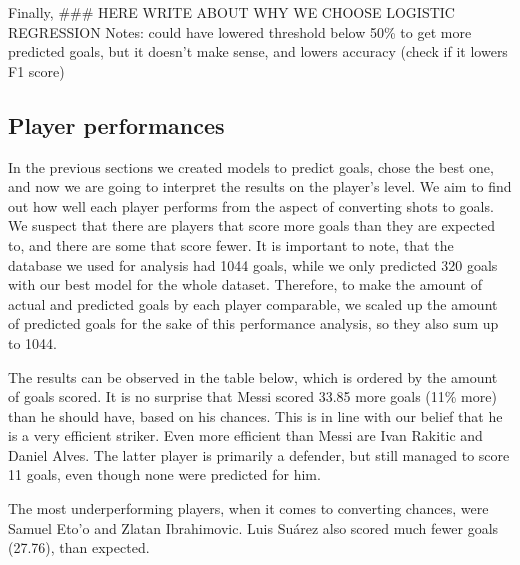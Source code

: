 \documentclass[]{article}
\begin{document}
Finally, \#\#\# HERE WRITE ABOUT WHY WE CHOOSE LOGISTIC REGRESSION
Notes: could have lowered threshold below 50\% to get more predicted
goals, but it doesn't make sense, and lowers accuracy (check if it
lowers F1 score)

\hypertarget{player-performances}{%
\subsection{Player performances}\label{player-performances}}

In the previous sections we created models to predict goals, chose the
best one, and now we are going to interpret the results on the player's
level. We aim to find out how well each player performs from the aspect
of converting shots to goals. We suspect that there are players that
score more goals than they are expected to, and there are some that
score fewer. It is important to note, that the database we used for
analysis had 1044 goals, while we only predicted 320 goals with our best
model for the whole dataset. Therefore, to make the amount of actual and
predicted goals by each player comparable, we scaled up the amount of
predicted goals for the sake of this performance analysis, so they also
sum up to 1044.

The results can be observed in the table below, which is ordered by the
amount of goals scored. It is no surprise that Messi scored 33.85 more
goals (11\% more) than he should have, based on his chances. This is in
line with our belief that he is a very efficient striker. Even more
efficient than Messi are Ivan Rakitic and Daniel Alves. The latter
player is primarily a defender, but still managed to score 11 goals,
even though none were predicted for him.

The most underperforming players, when it comes to converting chances,
were Samuel Eto'o and Zlatan Ibrahimovic. Luis Suárez also scored much
fewer goals (27.76), than expected.
\end{document}
